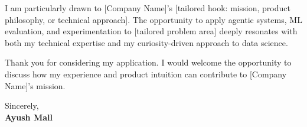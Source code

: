\documentclass[10pt,a4paper]{article}
\begin{document}
I am particularly drawn to {[Company Name]}'s {[tailored hook: mission, product philosophy, or technical approach]}. The opportunity to apply agentic systems, ML evaluation, and experimentation to {[tailored problem area]} deeply resonates with both my technical expertise and my curiosity-driven approach to data science.

Thank you for considering my application. I would welcome the opportunity to discuss how my experience and product intuition can contribute to {[Company Name]}'s mission.

\vspace{1em}

Sincerely, \\
\textbf{Ayush Mall}
\end{document}

